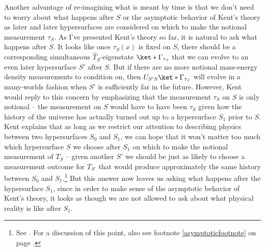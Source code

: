 \documentclass[12pt]{report}
\providecommand{\DIFaddbegin}{} %
\providecommand{\DIFaddend}{} %
\providecommand{\DIFdelbegin}{} %
\providecommand{\DIFdelend}{} %
\begin{document}
Another advantage of re-imagining what is meant by time is that we don't need to worry about what happens after $S$ or the asymptotic behavior of Kent's theory as later and later hypersurfaces are considered on which to make the notional measurement $\tau_S$. As I've presented Kent's theory so far, it is natural to ask what happens after $S$. It looks like once $\tau_S(x)$ is fixed on $S$, there should be a corresponding simultaneous $\hat{T}_S$-eigenstate $\ket*{\Gamma_{\tau_S}}$ %
\DIFdelbegin %
\DIFdelend \DIFaddbegin {}\DIFaddend %
that we can evolve to an even later hypersurface $S'$ after $S$. But if there are no more notional mass-energy density measurements to condition on, then $U_{S'S}\ket*{\Gamma_{\tau_S}}$ will evolve in a many-worlds fashion when $S'$ is sufficiently far in the future. However, Kent would reply to this concern by emphasizing that the measurement $\tau_S$ on $S$ is only notional -- the measurement on $S$ would have to have been $\tau_S$ given how the history of the universe has actually turned out up to a hypersurface $S_1$ prior to $S$. Kent explains that as long as we restrict our attention to describing physics between two hypersurfaces $S_0$ and $S_1$, we can hope that it won't matter too much which hypersurface $S$ we choose after $S_1$ on which to make the notional measurement of $T_S$ -- given another $S'$ we should be just as likely to choose a measurement outcome for $T_{S'}$ that would produce approximately the same history between $S_0$ and $S_1$.\footnote{See  \cite[3]{Kent2014}. For a discussion of this point, also see footnote \ref{asymptoticfootnote} on page \pageref{asymptoticfootnote}.} But this answer now leaves us asking what happens after the hypersurface $S_1$, since in order to make sense of the asymptotic behavior of Kent's theory, it looks as though we are not allowed to ask about what physical reality is like after $S_1$.  
\end{document}
